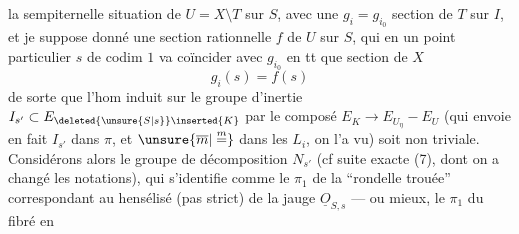 la sempiternelle situation de $U=X\setminus T$ sur $S$, avec une $g_i=g_{i_0}$ section de $T$ sur $I$, et je suppose donné une section rationnelle $f$ de $U$ sur $S$, qui en un point particulier $s$ de  codim $1$ va coïncider avec $g_{i_0}$ en tt que section de $X$
\[
g_i(s)=f(s)
\]
de sorte que l'hom induit sur le groupe d'inertie $I_{s'}\subset E_{\deleted{\unsure{S|s}}\inserted{K}}$ par le composé $E_K\longrightarrow E_{U_\eta}-E_U$ (qui envoie en fait $I_{s'}$ dans $\pi$, et $\unsure{\overline m|\overset{m}{=}}$ dans les $L_i$, on l'a vu) soit non  triviale. Considérons alors le groupe de décomposition $N_{s'}$ (cf suite exacte (7), dont on a changé les notations), qui s'identifie comme le $\pi_1$ de la ``rondelle trouée'' correspondant au hensélisé (pas strict) de la jauge $\underline O_{S,s}$ --- ou mieux, le $\pi_1$ du fibré en
